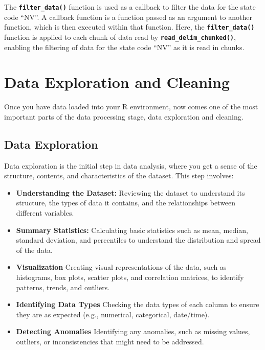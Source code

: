 \documentclass[
]{book}
\begin{document}
The \textbf{\texttt{filter\_data()}} function is used as a callback to filter the data for the state code ``NV''. A callback function is a function passed as an argument to another function, which is then executed within that function. Here, the \textbf{\texttt{filter\_data()}} function is applied to each chunk of data read by \textbf{\texttt{read\_delim\_chunked()}}, enabling the filtering of data for the state code ``NV'' as it is read in chunks.

\chapter{Data Exploration and Cleaning}\label{data-exploration-and-cleaning}

Once you have data loaded into your R environment, now comes one of the most important parts of the data processing stage, data exploration and cleaning.

\section*{Data Exploration}\label{data-exploration}

Data exploration is the initial step in data analysis, where you get a sense of the structure, contents, and characteristics of the dataset. This step involves:

\begin{itemize}
\item
  \textbf{Understanding the Dataset:}
  Reviewing the dataset to understand its structure, the types of data it contains, and the relationships between different variables.
\item
  \textbf{Summary Statistics:}
  Calculating basic statistics such as mean, median, standard deviation, and percentiles to understand the distribution and spread of the data.
\item
  \textbf{Visualization}
  Creating visual representations of the data, such as histograms, box plots, scatter plots, and correlation matrices, to identify patterns, trends, and outliers.
\item
  \textbf{Identifying Data Types}
  Checking the data types of each column to ensure they are as expected (e.g., numerical, categorical, date/time).
\item
  \textbf{Detecting Anomalies}
  Identifying any anomalies, such as missing values, outliers, or inconsistencies that might need to be addressed.
\end{itemize}
\end{document}
